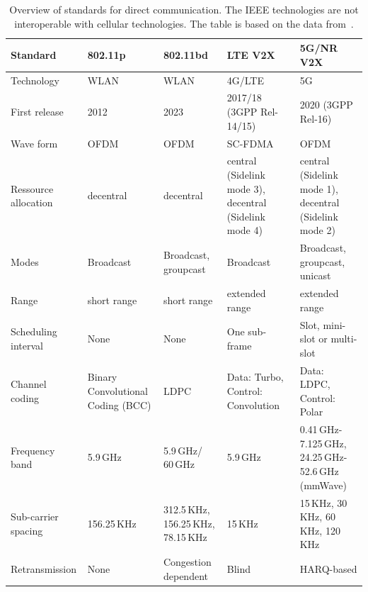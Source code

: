 \begin{table}[hbt!]
\begin{footnotesize}
\begin{tabular}{|p{2.4cm}|p{2.5cm}|p{2.5cm}|p{2.5cm}|p{2.5cm}|}
\hline 
\textbf{Standard} & \textbf{802.11p} &  \textbf{802.11bd} & \textbf{LTE V2X} & \textbf{5G/NR V2X} \\ 
\hline 
Technology & WLAN & WLAN & 4G/LTE & 5G \\ 
\hline 
First release & 2012 & 2023 & 2017/18 (3GPP Rel-14/15) & 2020 (3GPP Rel-16)  \\ \hline
Wave form & OFDM & OFDM & SC-FDMA & OFDM \\ 
\hline 
Ressource allocation & decentral & decentral  & central (Sidelink mode 3), decentral (Sidelink mode 4) &  central (Sidelink mode 1), decentral (Sidelink mode 2) \\ \hline

Modes & Broadcast & Broadcast, groupcast & Broadcast & Broadcast,
groupcast, unicast
\\ \hline 
Range & short range &  short range & extended range
 & extended range \\ 
\hline 
Scheduling interval &None& None & One sub-frame & Slot, mini-slot or multi-slot \\
\hline
Channel coding & Binary Convolutional Coding (BCC)  & LDPC & Data: Turbo, 
Control: Convolution & Data: LDPC, Control: Polar 
\\ \hline 
Frequency band & 5.9\,GHz & 5.9\,GHz/ 60\,GHz & 5.9\,GHz &  0.41\,GHz-7.125\,GHz, 24.25\,GHz-52.6\,GHz (mmWave) \\ \hline 
Sub-carrier spacing &  156.25\,KHz & 312.5\,KHz, 156.25\,KHz, 78.15\,KHz & 15\,KHz & 15\,KHz, 30\,\,KHz, 60\,KHz, 120\,KHz \\ \hline 
Retransmission & None  & Congestion dependent & Blind & HARQ-based \\ 
\hline 
\end{tabular} 
\end{footnotesize}
\caption[Overview of standards for direct communication]{Overview of standards for direct communication. The IEEE technologies are not interoperable with cellular technologies. The table is based on the data from~\cite{shrestha-2020-com,bazzi-2021-com,molina-2020-com}.}
\label{tab:directcom-overview}
\end{table}
